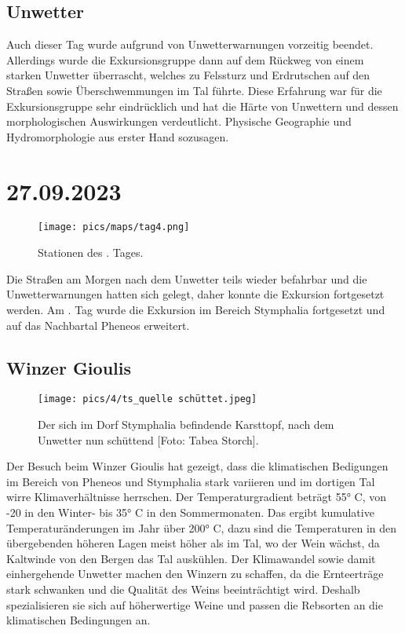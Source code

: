 \documentclass[preprint]{geomorphica} %
\begin{document}
\subsection{Unwetter}

Auch dieser Tag wurde aufgrund von Unwetterwarnungen vorzeitig beendet. Allerdings wurde die Exkursionsgruppe dann auf dem Rückweg von einem starken Unwetter überrascht, welches zu Felssturz und Erdrutschen auf den Straßen sowie Überschwemmungen im Tal führte. Diese Erfahrung war für die Exkursionsgruppe sehr eindrücklich und hat die Härte von Unwettern und dessen morphologischen Auswirkungen verdeutlicht. Physische Geographie und Hydromorphologie aus erster Hand sozusagen.


\newpage

\section{27.09.2023}

\begin{figure}[!h]
    \centering
    \texttt{[image: pics/maps/tag4.png]}
    \caption{Stationen des \theday. Tages.}
    \label{pic:tag4}
\end{figure}

Die Straßen am Morgen nach dem Unwetter teils wieder befahrbar und die Unwetterwarnungen hatten sich gelegt, daher konnte die Exkursion fortgesetzt werden.
Am \theday. Tag wurde die Exkursion im Bereich Stymphalia fortgesetzt und auf das Nachbartal Pheneos erweitert.

\subsection{Winzer Gioulis}

\begin{wrapfigure}{r}{0.5\textwidth}
    \centering
    \texttt{[image: pics/4/ts\_quelle schüttet.jpeg]}
    \caption{Der sich im Dorf Stymphalia befindende Karsttopf, nach dem Unwetter nun schüttend [Foto: Tabea Storch].}
    \label{pic:karsttopfschüttet}
    \vspace{-5mm}
\end{wrapfigure}

Der Besuch beim Winzer Gioulis hat gezeigt, dass die klimatischen Bedigungen im Bereich von Pheneos und Stymphalia stark variieren und im dortigen Tal wirre Klimaverhältnisse herrschen. Der Temperaturgradient beträgt 55° C, von -20 in den Winter- bis 35° C in den Sommermonaten. Das ergibt kumulative Temperaturänderungen im Jahr über 200° C, dazu sind die Temperaturen in den übergebenden höheren Lagen meist höher als im Tal, wo der Wein wächst, da Kaltwinde von den Bergen das Tal auskühlen. Der Klimawandel sowie damit einhergehende Unwetter machen den Winzern zu schaffen, da die Ernteerträge stark schwanken und die Qualität des Weins beeinträchtigt wird. Deshalb spezialisieren sie sich auf höherwertige Weine und passen die Rebsorten an die klimatischen Bedingungen an.
\end{document}
